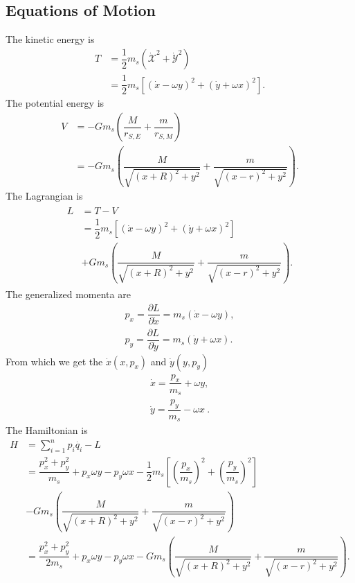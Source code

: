 \subsection{Equations of Motion}
The kinetic energy is
\begin{align}
\label{eq:r3b-T}
\nonumber T &= \dfrac{1}{2} m_s (\dot{\mathscr{X}}^2 + \dot{\mathscr{Y}}^2) \\
&= \dfrac{1}{2} m_s \left[(\dot{x}-\omega y)^2 + (\dot{y}+\omega x)^2\right].
\end{align}
The potential energy is
\begin{align}
\nonumber V &= - G m_s \left(\dfrac{M}{r_{S,E}} + \dfrac{m}{r_{S,M}}\right) \\
&= - G m_s \left(\dfrac{M}{\sqrt{(x+R)^2+y^2}} + \dfrac{m}{\sqrt{(x-r)^2+y^2}}\right).
\end{align}
The Lagrangian is
\begin{align}
\begin{split}
L &= T - V \\
&= \dfrac{1}{2} m_s \left[(\dot{x}-\omega y)^2 + (\dot{y}+\omega x)^2\right] \\
&+ G m_s \left(\dfrac{M}{\sqrt{(x+R)^2+y^2}} + \dfrac{m}{\sqrt{(x-r)^2+y^2}}\right).
\end{split}
\end{align}
The generalized momenta are
\begin{align}
p_x = \dfrac{\partial L}{\partial \dot{x}} = m_s(\dot{x} - \omega y), \\
p_y = \dfrac{\partial L}{\partial \dot{y}} = m_s(\dot{y} + \omega x).
\end{align}
From which we get the $\dot{x}(x,p_x)$ and $\dot{y}(y,p_y)$
\begin{align}
\dot{x} = \dfrac{p_x}{m_s} + \omega y, \\
\dot{y} = \dfrac{p_y}{m_s} - \omega x \ .
\end{align}
The Hamiltonian is
\begin{align}
H &= \sum\limits_{i=1}^n p_i \dot{q_i} - L \\[0.6cm]
&= \dfrac{p_x^2 + p_y^2}{m_s} + p_x\omega y - p_y\omega x - \dfrac{1}{2} m_s \left[\left(\dfrac{p_x}{m_s}\right)^2 + \left(\dfrac{p_y}{m_s}\right)^2\right] \\
&- G m_s \left(\dfrac{M}{\sqrt{(x+R)^2+y^2}} + \dfrac{m}{\sqrt{(x-r)^2+y^2}}\right) \nonumber \\[0.6cm]
&= \dfrac{p_x^2 + p_y^2}{2 m_s} + p_x\omega y - p_y\omega x - G m_s \left(\dfrac{M}{\sqrt{(x+R)^2+y^2}} + \dfrac{m}{\sqrt{(x-r)^2+y^2}}\right).
\end{align}
